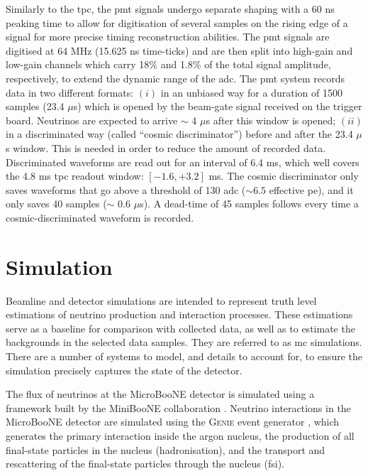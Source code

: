 Similarly to the \acrshort{tpc}, the \acrshort{pmt} signals undergo separate shaping with a 60 ns peaking time to allow for digitisation of several samples on the rising edge of a signal for more precise timing reconstruction abilities. The \acrshort{pmt} signals are digitised at 64 MHz (15.625 ns time-ticks) and are then split into high-gain and low-gain channels which carry 18\% and 1.8\% of the total signal amplitude, respectively, to extend the dynamic range of the \acrfull{adc}.
The \acrshort{pmt} system records data in two different formats: $(i)$ in an unbiased way for a duration of 1500 samples (23.4 $\mu$s) which is opened by the beam-gate signal received on the trigger board. Neutrinos are expected to arrive $\sim$ 4 $\mu$s after this window is opened; $(ii)$ in a discriminated way (called ``cosmic discriminator'') before and after the 23.4 $\mu$s window. This is needed in order to reduce the amount of recorded data. Discriminated waveforms are read out for an interval of 6.4 ms, which well covers the 4.8 ms \acrshort{tpc} readout window: $[-1.6, +3.2]$ ms. The cosmic discriminator only saves waveforms that go above a threshold of 130 \acrshort{adc} ($\sim6.5$ effective \acrshort{pe}), and it only saves 40 samples ($\sim$ 0.6 $\mu$s). A dead-time of 45 samples follows every time a cosmic-discriminated waveform is recorded.











\section{Simulation}
\label{sec:simulation}


Beamline and detector simulations are intended to represent truth level estimations of neutrino production and interaction processes. These estimations serve as a baseline for comparison with collected data, as well as to estimate the backgrounds in the selected data samples. They are referred to as \acrfull{mc} simulations. There are a number of systems to model, and details to account for, to ensure the simulation precisely captures the state of the detector.

The flux of neutrinos at the MicroBooNE detector is simulated using a framework built by the MiniBooNE collaboration \cite{miniboone_flux}.
Neutrino interactions in the MicroBooNE detector are simulated using the \textsc{Genie} event generator \cite{GENIE}, which generates the primary interaction inside the argon nucleus, the production of all final-state particles in the nucleus (hadronisation), and the transport and rescattering of the final-state particles through the nucleus (\acrshort{fsi}).

